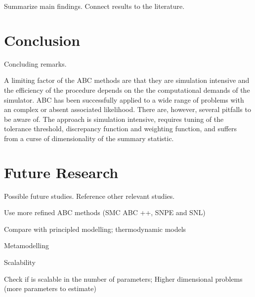 Summarize main findings. Connect results to the literature. 

\section{Conclusion}\label{sec:conclusion}

Concluding remarks.

A limiting factor of the ABC methods are that they are simulation intensive and the efficiency of the procedure depends on the the computational demands of the simulator.  
ABC has been successfully applied to a wide range of problems with an complex or absent associated likelihood. There are, however, several pitfalls to be aware of. The approach is simulation intensive, requires tuning of the tolerance threshold, discrepancy function and weighting function, and suffers from a curse of dimensionality of the summary statistic.  

\section{Future Research}\label{sec:future}

Possible future studies. Reference other relevant studies. 

Use more refined ABC methods
(SMC ABC ++, SNPE and SNL)

Compare with principled modelling; thermodynamic models

Metamodelling

Scalability 

Check if is scalable in the number of parameters;
Higher dimensional problems (more parameters to estimate)

